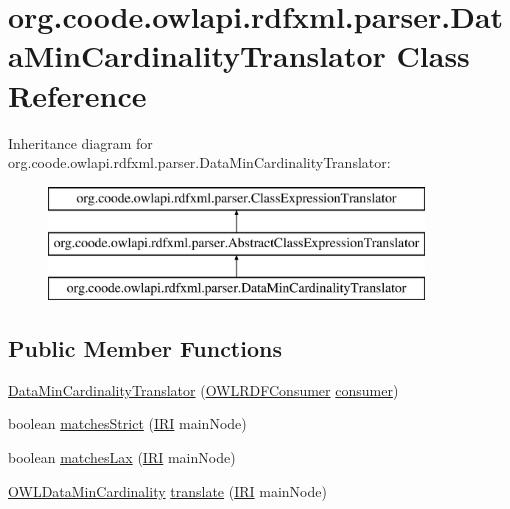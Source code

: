 \hypertarget{classorg_1_1coode_1_1owlapi_1_1rdfxml_1_1parser_1_1_data_min_cardinality_translator}{\section{org.\-coode.\-owlapi.\-rdfxml.\-parser.\-Data\-Min\-Cardinality\-Translator Class Reference}
\label{classorg_1_1coode_1_1owlapi_1_1rdfxml_1_1parser_1_1_data_min_cardinality_translator}
}
Inheritance diagram for org.\-coode.\-owlapi.\-rdfxml.\-parser.\-Data\-Min\-Cardinality\-Translator\-:\begin{figure}[H]
\begin{center}
\leavevmode
\includegraphics[height=3.000000cm]{classorg_1_1coode_1_1owlapi_1_1rdfxml_1_1parser_1_1_data_min_cardinality_translator}
\end{center}
\end{figure}
\subsection*{Public Member Functions}
\begin{DoxyCompactItemize}
\item 
\hyperlink{classorg_1_1coode_1_1owlapi_1_1rdfxml_1_1parser_1_1_data_min_cardinality_translator_a9bd11fc66e37365a76c2aa835227f932}{Data\-Min\-Cardinality\-Translator} (\hyperlink{classorg_1_1coode_1_1owlapi_1_1rdfxml_1_1parser_1_1_o_w_l_r_d_f_consumer}{O\-W\-L\-R\-D\-F\-Consumer} \hyperlink{classorg_1_1coode_1_1owlapi_1_1rdfxml_1_1parser_1_1_abstract_class_expression_translator_ae547084cdd5b92c03835b5aa404f823b}{consumer})
\item 
boolean \hyperlink{classorg_1_1coode_1_1owlapi_1_1rdfxml_1_1parser_1_1_data_min_cardinality_translator_a5db76daa0563668ce1af046fb1251415}{matches\-Strict} (\hyperlink{classorg_1_1semanticweb_1_1owlapi_1_1model_1_1_i_r_i}{I\-R\-I} main\-Node)
\item 
boolean \hyperlink{classorg_1_1coode_1_1owlapi_1_1rdfxml_1_1parser_1_1_data_min_cardinality_translator_a52d62317f98f694b47b6ac902faf7dbc}{matches\-Lax} (\hyperlink{classorg_1_1semanticweb_1_1owlapi_1_1model_1_1_i_r_i}{I\-R\-I} main\-Node)
\item 
\hyperlink{interfaceorg_1_1semanticweb_1_1owlapi_1_1model_1_1_o_w_l_data_min_cardinality}{O\-W\-L\-Data\-Min\-Cardinality} \hyperlink{classorg_1_1coode_1_1owlapi_1_1rdfxml_1_1parser_1_1_data_min_cardinality_translator_a89c2ea17c5383cae4458809deb37f2b0}{translate} (\hyperlink{classorg_1_1semanticweb_1_1owlapi_1_1model_1_1_i_r_i}{I\-R\-I} main\-Node)
\end{DoxyCompactItemize}
